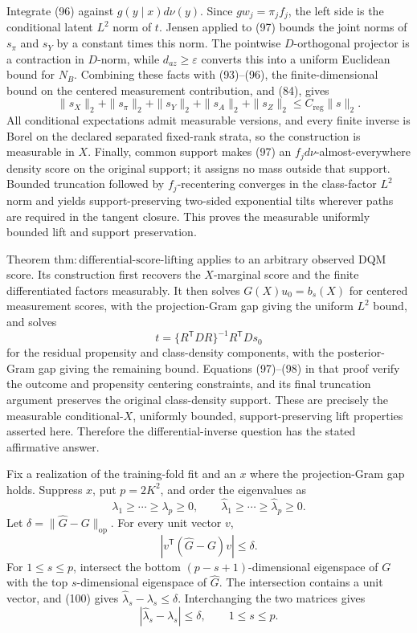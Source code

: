 Integrate (96) against \(g(y\mid x)d\nu(y)\).  Since \(gw_j=\pi_jf_j\), the left side is the conditional latent \(L^2\) norm of \(t\).  Jensen applied to (97) bounds the joint norms of \(s_\pi\) and \(s_Y\) by a constant times this norm.  The pointwise \(D\)-orthogonal projector is a contraction in \(D\)-norm, while \(d_{az}\geq\varepsilon\) converts this into a uniform Euclidean bound for \(N_B\).  Combining these facts with (93)--(96), the finite-dimensional bound on the centered measurement contribution, and (84), gives
\[
 \|s_X\|_2+\|s_\pi\|_2+\|s_Y\|_2+\|s_A\|_2+\|s_Z\|_2
 \leq C_{\mathrm{reg}}\|s\|_2. \tag{99}
\]
All conditional expectations admit measurable versions, and every finite inverse is Borel on the declared separated fixed-rank strata, so the construction is measurable in \(X\).  Finally, common support makes (97) an \(f_jd\nu\)-almost-everywhere density score on the original support; it assigns no mass outside that support.  Bounded truncation followed by \(f_j\)-recentering converges in the class-factor \(L^2\) norm and yields support-preserving two-sided exponential tilts wherever paths are required in the tangent closure.  This proves the measurable uniformly bounded lift and support preservation.

Theorem \(\mathrm{thm{:}differential\mbox{-}score\mbox{-}lifting}\) applies to an arbitrary observed DQM score.  Its construction first recovers the \(X\)-marginal score and the finite differentiated factors measurably.  It then solves \(G(X)u_0=b_s(X)\) for centered measurement scores, with the projection-Gram gap giving the uniform \(L^2\) bound, and solves
\[
t=\{R^{\mathsf T}DR\}^{-1}R^{\mathsf T}Ds_0
\]
for the residual propensity and class-density components, with the posterior-Gram gap giving the remaining bound.  Equations (97)--(98) in that proof verify the outcome and propensity centering constraints, and its final truncation argument preserves the original class-density support.  These are precisely the measurable conditional-\(X\), uniformly bounded, support-preserving lift properties asserted here.  Therefore the differential-inverse question has the stated affirmative answer.

Fix a realization of the training-fold fit and an \(x\) where the projection-Gram gap holds.  Suppress \(x\), put \(p=2K^2\), and order the eigenvalues as
\[
 \lambda_1\geq\cdots\geq\lambda_p\geq0,\qquad
 \widehat\lambda_1\geq\cdots\geq\widehat\lambda_p\geq0.
\]
Let \(\delta=\|\widehat G-G\|_{\mathrm{op}}\).  For every unit vector \(v\),
\[
 |v^{\mathsf T}(\widehat G-G)v|\leq\delta. \tag{100}
\]
For \(1\leq s\leq p\), intersect the bottom \((p-s+1)\)-dimensional eigenspace of \(G\) with the top \(s\)-dimensional eigenspace of \(\widehat G\).  The intersection contains a unit vector, and (100) gives
\(\widehat\lambda_s-\lambda_s\leq\delta\).  Interchanging the two matrices gives
\[
 |\widehat\lambda_s-\lambda_s|\leq\delta,\qquad 1\leq s\leq p. \tag{101}
\]

